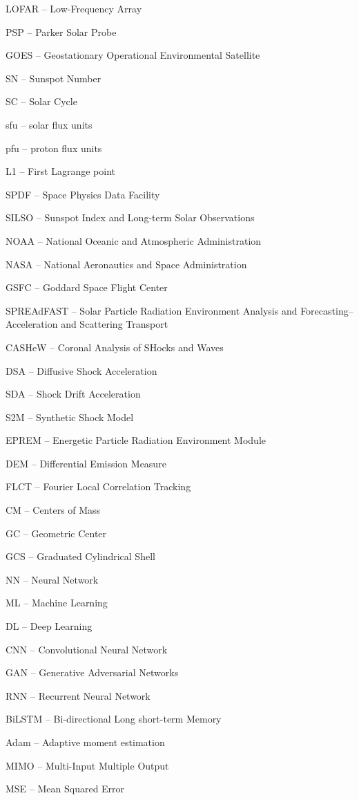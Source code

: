 LOFAR -- Low-Frequency Array

PSP -- Parker Solar Probe

GOES -- Geostationary Operational Environmental Satellite

SN -- Sunspot Number

SC -- Solar Cycle

sfu -- solar flux units

pfu -- proton flux units

L1 -- First Lagrange point

SPDF -- Space Physics Data Facility

SILSO -- Sunspot Index and Long-term Solar Observations

NOAA -- National Oceanic and Atmospheric Administration

NASA -- National Aeronautics and Space Administration

GSFC -- Goddard Space Flight Center

SPREAdFAST -- Solar Particle Radiation Environment Analysis and Forecasting–Acceleration and Scattering Transport

CASHeW -- Coronal Analysis of SHocks and Waves

DSA -- Diffusive Shock Acceleration

SDA -- Shock Drift Acceleration

S2M -- Synthetic Shock Model

EPREM -- Energetic Particle Radiation Environment Module

DEM -- Differential Emission Measure

FLCT -- Fourier Local Correlation Tracking

CM -- Centers of Mass

GC -- Geometric Center

GCS -- Graduated Cylindrical Shell

NN -- Neural Network

ML -- Machine Learning

DL -- Deep Learning

CNN -- Convolutional Neural Network

GAN -- Generative Adversarial Networks

RNN -- Recurrent Neural Network

BiLSTM -- Bi-directional Long short-term Memory

Adam -- Adaptive moment estimation

MIMO -- Multi-Input Multiple Output

MSE -- Mean Squared Error

